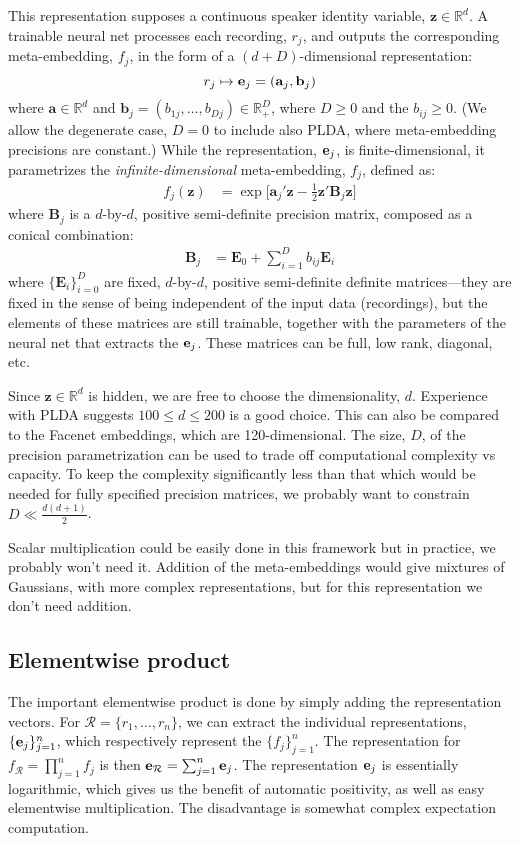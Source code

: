 \documentclass[a4paper,oneside,12pt,english]{report}
\def\zvec{\mathbf{z}}
\def\R{\mathbb{R}}
\def\Bmat{\mathbf{B}}
\def\Emat{\mathbf{E}}
\def\avec{\mathbf{a}}
\def\bvec{\mathbf{b}}
\def\Rset{\mathcal{R}}
\begin{document}
This representation supposes a continuous speaker identity variable, $\zvec\in\R^d$. A trainable neural net processes each recording, $r_j$, and outputs the corresponding meta-embedding, $f_j$, in the form of a $(d+D)$-dimensional representation:
$$r_j\mapsto\evec_j=(\avec_j,\bvec_j)$$
where $\avec\in\R^d$ and $\bvec_j=(b_{1j},\ldots,b_{Dj})\in\R_+^D$, where $D\ge0$ and the $b_{ij}\ge0$. (We allow the degenerate case, $D=0$ to include also PLDA, where meta-embedding precisions are constant.) While the representation, $\mathbf{e}_j$, is finite-dimensional, it parametrizes the \emph{infinite-dimensional} meta-embedding, $f_j$, defined as:
\begin{align}
\label{eq:gaussembed}
f_j(\zvec) &= \exp\bigl[\avec_j'\zvec -\frac12\zvec'\Bmat_j\zvec]
\end{align}
where $\Bmat_j$ is a $d$-by-$d$, positive semi-definite precision matrix, composed as a conical combination:
\begin{align}
\label{eq:Bmat}
\Bmat_j &= \Emat_0 + \sum_{i=1}^D b_{ij} \Emat_i
\end{align}
where $\{\Emat_i\}_{i=0}^D$ are fixed, $d$-by-$d$, positive semi-definite definite matrices---they are fixed in the sense of being independent of the input data (recordings), but the elements of these matrices are still trainable, together with the parameters of the neural net that extracts the $\mathbf{e}_j$. These matrices can be full, low rank, diagonal, etc. 

Since $\zvec\in\R^d$ is hidden, we are free to choose the dimensionality, $d$. Experience with PLDA suggests $100\le d\le200$ is a good choice. This can also be compared to the Facenet embeddings, which are 120-dimensional. The size, $D$, of the precision parametrization can be used to trade off computational complexity vs capacity. To keep the complexity significantly less than that which would be needed for fully specified precision matrices, we probably want to constrain $D\ll\frac{d(d+1)}{2}$. 

Scalar multiplication could be easily done in this framework but in practice, we probably won't need it. Addition of the meta-embeddings would give mixtures of Gaussians, with more complex representations, but for this representation we don't need addition.

\subsection{Elementwise product}
The important elementwise product is done by simply adding the representation vectors. For $\Rset=\{r_1,\ldots,r_n\}$, we can extract the individual representations, $\{\mathbf{e}_j\}_{j=1}^n$, which respectively represent the $\{f_j\}_{j=1}^n$. The representation for $f_\Rset=\prod_{j=1}^n f_j$ is then $\evec_\Rset=\sum_{j=1}^n \evec_j$. The representation $\mathbf{e}_j$ is essentially logarithmic, which gives us the benefit of automatic positivity, as well as easy elementwise multiplication. The disadvantage is somewhat complex expectation computation.
\end{document}
